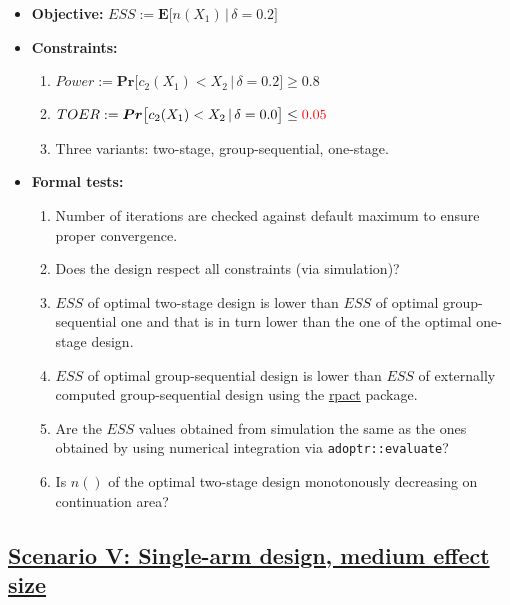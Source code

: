 \documentclass[]{book}
\providecommand{\tightlist}{%
  \setlength{\itemsep}{0pt}\setlength{\parskip}{0pt}}
\begin{document}
\begin{itemize}
\tightlist
\item
  \textbf{Objective:} \(ESS := \boldsymbol{E}\big[n(X_1)\,|\,\delta=0.2\big]\)
\item
  \textbf{Constraints:}

  \begin{enumerate}
  \def\labelenumi{\arabic{enumi}.}
  \tightlist
  \item
    \(Power := \boldsymbol{Pr}\big[c_2(X_1) < X_2\,|\,\delta=0.2\big] \geq 0.8\)
  \item
    \(TOER := \boldsymbol{Pr}\big[c_2(X_1) < X_2\,|\,\delta=0.0\big] \leq \color{red}{0.05}\)
  \item
    Three variants: two-stage, group-sequential, one-stage.
  \end{enumerate}
\item
  \textbf{Formal tests:}

  \begin{enumerate}
  \def\labelenumi{\arabic{enumi}.}
  \tightlist
  \item
    Number of iterations are checked against default maximum to ensure proper
    convergence.
  \item
    Does the design respect all constraints (via simulation)?
  \item
    \(ESS\) of optimal two-stage design is lower than \(ESS\) of optimal
    group-sequential one and that is in turn lower than the one of the
    optimal one-stage design.
  \item
    \(ESS\) of optimal group-sequential design is lower than \(ESS\) of
    externally computed group-sequential design using the \href{https://rpact.org/}{rpact} package.
  \item
    Are the \(ESS\) values obtained from simulation the same as the ones
    obtained by using numerical integration via \texttt{adoptr::evaluate}?
  \item
    Is \(n()\) of the optimal two-stage design monotonously decreasing on
    continuation area?
  \end{enumerate}
\end{itemize}

\hypertarget{scenario-v-single-arm-design-medium-effect-size}{%
\subsection{\texorpdfstring{\protect\hyperlink{scenarioV}{Scenario V: Single-arm design, medium effect size}}{Scenario V: Single-arm design, medium effect size}}\label{scenario-v-single-arm-design-medium-effect-size}}
\end{document}
